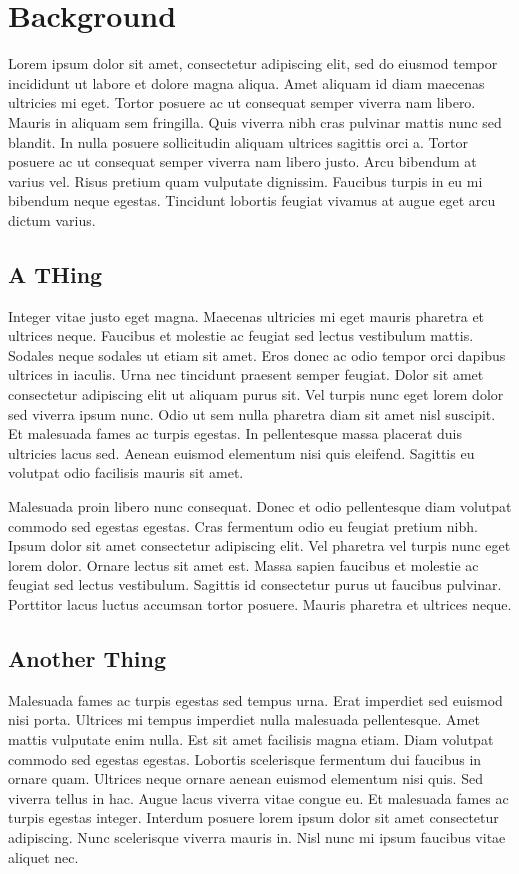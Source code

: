 \section{Background}
\label{sec:background}

Lorem ipsum dolor sit amet, consectetur adipiscing elit, sed do eiusmod tempor incididunt ut labore et dolore magna aliqua. Amet aliquam id diam maecenas ultricies mi eget. Tortor posuere ac ut consequat semper viverra nam libero. Mauris in aliquam sem fringilla. Quis viverra nibh cras pulvinar mattis nunc sed blandit. In nulla posuere sollicitudin aliquam ultrices sagittis orci a. Tortor posuere ac ut consequat semper viverra nam libero justo. Arcu bibendum at varius vel. Risus pretium quam vulputate dignissim. Faucibus turpis in eu mi bibendum neque egestas. Tincidunt lobortis feugiat vivamus at augue eget arcu dictum varius.

\subsection{A THing}
Integer vitae justo eget magna. Maecenas ultricies mi eget mauris pharetra et ultrices neque. Faucibus et molestie ac feugiat sed lectus vestibulum mattis. Sodales neque sodales ut etiam sit amet. Eros donec ac odio tempor orci dapibus ultrices in iaculis. Urna nec tincidunt praesent semper feugiat. Dolor sit amet consectetur adipiscing elit ut aliquam purus sit. Vel turpis nunc eget lorem dolor sed viverra ipsum nunc. Odio ut sem nulla pharetra diam sit amet nisl suscipit. Et malesuada fames ac turpis egestas. In pellentesque massa placerat duis ultricies lacus sed. Aenean euismod elementum nisi quis eleifend. Sagittis eu volutpat odio facilisis mauris sit amet.

Malesuada proin libero nunc consequat. Donec et odio pellentesque diam volutpat commodo sed egestas egestas. Cras fermentum odio eu feugiat pretium nibh. Ipsum dolor sit amet consectetur adipiscing elit. Vel pharetra vel turpis nunc eget lorem dolor. Ornare lectus sit amet est. Massa sapien faucibus et molestie ac feugiat sed lectus vestibulum. Sagittis id consectetur purus ut faucibus pulvinar. Porttitor lacus luctus accumsan tortor posuere. Mauris pharetra et ultrices neque.

\subsection{Another Thing}

Malesuada fames ac turpis egestas sed tempus urna. Erat imperdiet sed euismod nisi porta. Ultrices mi tempus imperdiet nulla malesuada pellentesque. Amet mattis vulputate enim nulla. Est sit amet facilisis magna etiam. Diam volutpat commodo sed egestas egestas. Lobortis scelerisque fermentum dui faucibus in ornare quam. Ultrices neque ornare aenean euismod elementum nisi quis. Sed viverra tellus in hac. Augue lacus viverra vitae congue eu. Et malesuada fames ac turpis egestas integer. Interdum posuere lorem ipsum dolor sit amet consectetur adipiscing. Nunc scelerisque viverra mauris in. Nisl nunc mi ipsum faucibus vitae aliquet nec.


